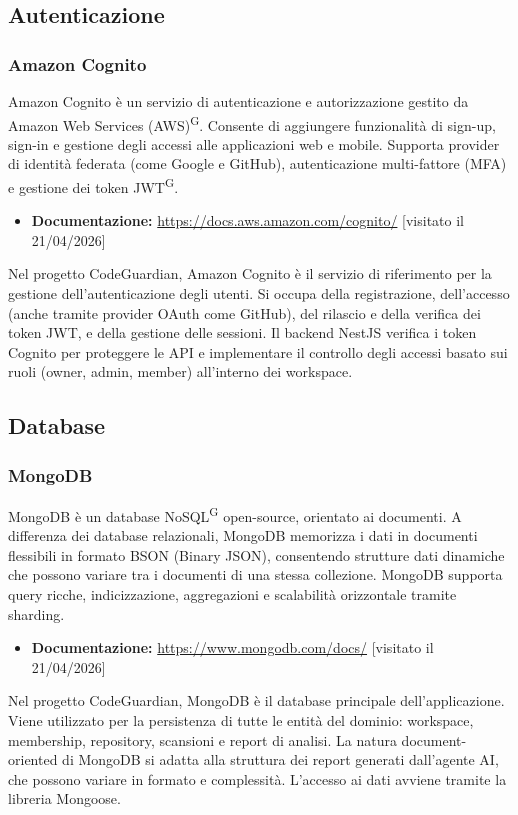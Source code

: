 \documentclass[a4paper, 11pt]{article}
\begin{document}
\subsection{Autenticazione}

\subsubsection{Amazon Cognito}
Amazon Cognito è un servizio di autenticazione e autorizzazione gestito da Amazon Web Services (AWS)\textsuperscript{G}. Consente di aggiungere funzionalità di sign-up, sign-in e gestione degli accessi alle applicazioni web e mobile. Supporta provider di identità federata (come Google e GitHub), autenticazione multi-fattore (MFA) e gestione dei token JWT\textsuperscript{G}.
\begin{itemize}
  \item \textbf{Documentazione:} \url{https://docs.aws.amazon.com/cognito/} [visitato il 21/04/2026]
\end{itemize}
Nel progetto CodeGuardian, Amazon Cognito è il servizio di riferimento per la gestione dell'autenticazione degli utenti. Si occupa della registrazione, dell'accesso (anche tramite provider OAuth come GitHub), del rilascio e della verifica dei token JWT, e della gestione delle sessioni. Il backend NestJS verifica i token Cognito per proteggere le API e implementare il controllo degli accessi basato sui ruoli (owner, admin, member) all'interno dei workspace.

\subsection{Database}

\subsubsection{MongoDB}
MongoDB è un database NoSQL\textsuperscript{G} open-source, orientato ai documenti. A differenza dei database relazionali, MongoDB memorizza i dati in documenti flessibili in formato BSON (Binary JSON), consentendo strutture dati dinamiche che possono variare tra i documenti di una stessa collezione. MongoDB supporta query ricche, indicizzazione, aggregazioni e scalabilità orizzontale tramite sharding.
\begin{itemize}
  \item \textbf{Documentazione:} \url{https://www.mongodb.com/docs/} [visitato il 21/04/2026]
\end{itemize}
Nel progetto CodeGuardian, MongoDB è il database principale dell'applicazione. Viene utilizzato per la persistenza di tutte le entità del dominio: workspace, membership, repository, scansioni e report di analisi. La natura document-oriented di MongoDB si adatta alla struttura dei report generati dall'agente AI, che possono variare in formato e complessità. L'accesso ai dati avviene tramite la libreria Mongoose.
\end{document}
